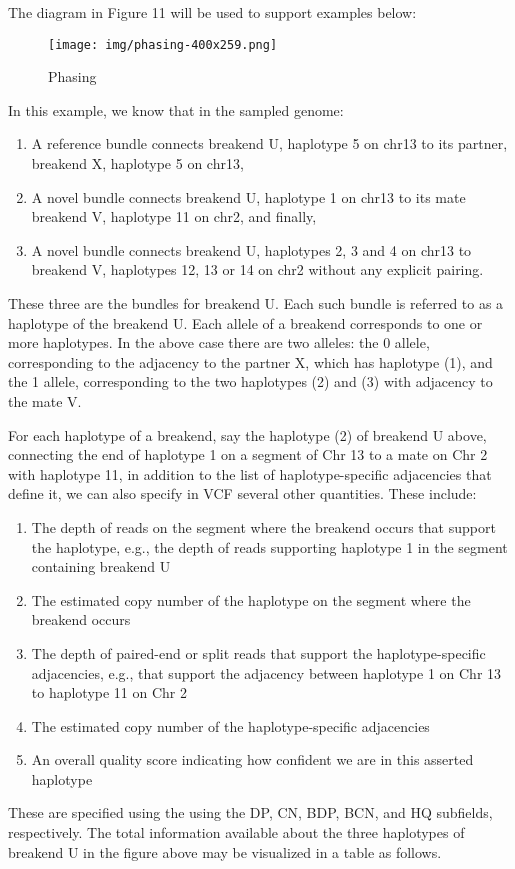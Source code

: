 \documentclass[8pt]{article}
\begin{document}
The diagram in Figure 11 will be used to support examples below:

\begin{figure}[ht]
\centering
\texttt{[image: img/phasing-400x259.png]}
\caption{Phasing}
\end{figure}

In this example, we know that in the sampled genome:

\begin{enumerate}
  \item A reference bundle connects breakend U, haplotype 5 on chr13 to its partner, breakend X, haplotype 5 on chr13,
  \item A novel bundle connects breakend U, haplotype 1 on chr13 to its mate breakend V, haplotype 11 on chr2, and finally,
  \item A novel bundle connects breakend U, haplotypes 2, 3 and 4 on chr13 to breakend V, haplotypes 12, 13 or 14 on chr2 without any explicit pairing.
\end{enumerate}

These three are the bundles for breakend U. Each such bundle is referred to as a haplotype of the breakend U.
Each allele of a breakend corresponds to one or more haplotypes.
In the above case there are two alleles: the 0 allele, corresponding to the adjacency to the partner X, which has haplotype (1), and the 1 allele, corresponding to the two haplotypes (2) and (3) with adjacency to the mate V.

For each haplotype of a breakend, say the haplotype (2) of breakend U above, connecting the end of haplotype 1 on a segment of Chr 13 to a mate on Chr 2 with haplotype 11, in addition to the list of haplotype-specific adjacencies that define it, we can also specify in VCF several other quantities.
These include:

\begin{enumerate}
  \item The depth of reads on the segment where the breakend occurs that support the haplotype, e.g., the depth of reads supporting haplotype 1 in the segment containing breakend U
  \item The estimated copy number of the haplotype on the segment where the breakend occurs
  \item The depth of paired-end or split reads that support the haplotype-specific adjacencies, e.g., that support the adjacency between haplotype 1 on Chr 13 to haplotype 11 on Chr 2
  \item The estimated copy number of the haplotype-specific adjacencies
  \item An overall quality score indicating how confident we are in this asserted haplotype
\end{enumerate}
These are specified using the using the DP, CN, BDP, BCN, and HQ subfields, respectively.
The total information available about the three haplotypes of breakend U in the figure above may be visualized in a table as follows.
\end{document}
